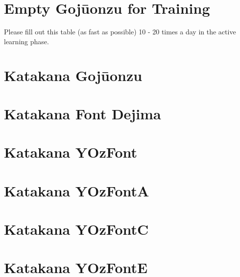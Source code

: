\section{Empty Gojūonzu for Training}\label{app:Leere50LauteTafel} Please
fill out this table (as fast as possible) 10 - 20 times a day in the active learning phase.

\newpage\section{Katakana Gojūonzu}
%
\newpage\JapaneseDejima\section{Katakana Font Dejima}
\JapaneseDefault
\newpage\JapaneseYOzFont\section{Katakana YOzFont}
\JapaneseDefault
\newpage\JapaneseYOzFontA\section{Katakana YOzFontA}
\JapaneseDefault
\newpage\JapaneseYOzFontC\section{Katakana YOzFontC}
\JapaneseDefault
\newpage\JapaneseYOzFontE\section{Katakana YOzFontE}
